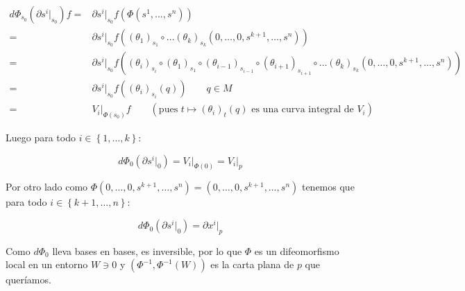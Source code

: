 \documentclass[11pt]{article}
\newcommand{\sett}[1]{\left\lbrace#1\right\rbrace}
\numberwithin{theorem}{subsection}
\newenvironment{proof}[1][Demostraci\'on]{\begin{trivlist}
		\item[\hskip \labelsep {\bfseries #1}]}{\end{trivlist}}
\newenvironment{definition}[1][Definici\'on]{\begin{trivlist}
		\item[\hskip \labelsep {\bfseries #1}]}{\end{trivlist}}
\newcommand{\qed}{\nobreak \ifvmode \relax \else
	\ifdim\lastskip<1.5em \hskip-\lastskip
	\hskip1.5em plus0em minus0.5em \fi \nobreak
	\vrule height0.75em width0.5em depth0.25em\fi}
\begin{document}
\begin{proof}
\begin{definition}
\begin{proof}
			\begin{equation*}
			\begin{aligned}
				d \Phi_{s_0} \left(\partial s^i \vert_{s_0}\right)f = & \partial s^i \vert_{s_0} f \left(\Phi(s^1, \dots, s^n)\right) \\
				= & \partial s^i \vert_{s_0} f \left((\theta_1)_{s_1} \circ \dots (\theta_k)_{s_k} (0, \dots, 0, s^{k+1}, \dots, s^n) \right) \\ 
				= & \partial s^i \vert_{s_0} f \left((\theta_i)_{s_i} \circ (\theta_1)_{s_1} \circ (\theta_{i-1})_{s_{i-1}}  \circ (\theta_{i+1})_{s_{i+1}} \circ  \dots (\theta_k)_{s_k} (0, \dots, 0, s^{k+1}, \dots, s^n) \right)  \\
				= & \partial s^i \vert_{s_0} f \left((\theta_i)_{s_i} (q) \right) \qquad q \in M \\
				= & V_i \vert_{\Phi(s_0)} f \qquad \left( \text{pues } t \mapsto (\theta_i)_t(q) \text{ es una curva integral de } V_i	\right)			
			\end{aligned}
			\end{equation*}
			
			Luego para todo $i \in \sett{1, \dots, k}$:
			
			\begin{equation}
				d \Phi_{0} \left(\partial s^i \vert_{0}\right) = V_i \vert_{\Phi(0)}  = V_i \vert_{p} 
			\end{equation}
			
			Por otro lado como $\Phi (0, \dots, 0, s^{k+1}, \dots, s^n) = (0, \dots, 0, s^{k+1}, \dots, s^n)$ tenemos que para todo $i \in \sett{k+1, \dots, n}$:
			
			\begin{equation}
				d \Phi_{0} \left(\partial s^i \vert_{0}\right) = \partial x^{i} \vert_{p} 
			\end{equation}
			
			Como $d \Phi_{0}$ lleva bases en bases, es inversible, por lo que $\Phi$ es un difeomorfismo local en un entorno $W \ni 0$ y $(\Phi^{-1},\Phi^{-1} \left(W\right))$ es la carta plana de $p$ que quer\'iamos. \qed
			
		\end{proof}
		
	\end{definition}
	
\end{proof}
\end{document}
